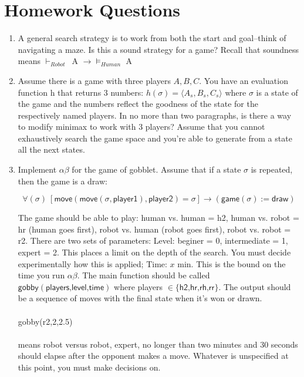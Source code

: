 \documentclass{article}
\begin{document}
\section*{Homework Questions}
\begin{enumerate}
\item A general search strategy is to work from both the start and goal--think of navigating a maze. Is this 
a sound strategy for a game? Recall that soundness means $\vdash_{Robot}$\ A $\rightarrow\models_{Human}$ A
\item Assume there is a game with three players $A,B,C$. You have an evaluation function h that returns
3 numbers: $h(\sigma) =  \langle A_s, B_s, C_s \rangle$ where $\sigma$ is a state of the game and the numbers reflect the goodness
of the state for the respectively named players. In no more than two paragraphs, is there a way to
modify minimax to work with 3 players? Assume that you cannot exhaustively search the game space
and you're able to generate from a state all the next states.
\item  Implement $\alpha\beta$ for the game of gobblet. Assume that if a state $\sigma$ is repeated, then the game is a draw:

\begin{equation}
\forall(\sigma)\ [\textsf{move}(\textsf{move}(\sigma, \textsf{player1}),\textsf{player2}) = \sigma] \rightarrow (\textsf{game}(\sigma) := \textsf{draw})
\end{equation}

The game should be able to play: human vs. human = h2, human vs. robot = hr (human goes first),
robot vs. human (robot goes first), robot vs. robot = r2. There are two sets of parameters: Level:
beginer = 0, intermediate = 1, expert = 2. This places a limit on the depth of the search. You must
decide experimentally how this is applied; Time: $x$ min. This is the bound on the time you run $\alpha\beta.$ The main function should be called $ \textsf{gobby} (\textsf{players,level,time})$ where players $\in \{\textsf{h2,hr,rh,rr}\}$. The
output should be a sequence of moves with the final state when it's won or drawn.
\\
\\
\textsf{gobby(r2,2,2.5)}
\\
\\
 means robot versus robot, expert, no longer than two minutes and 30 seconds should elapse after the
opponent makes a move. Whatever is unspecified at this point, you must make decisions on.
 
\end{enumerate}
\end{document}
